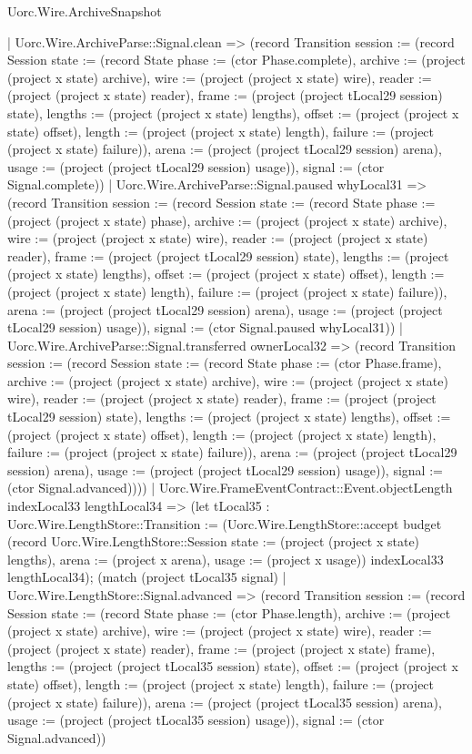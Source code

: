 \begin{lexlean}{Uorc.Wire.ArchiveSnapshot}
\begin{semanticmodule}
{        | Uorc.Wire.ArchiveParse::Signal.clean => (record Transition {session := (record Session {state := (record State {phase := (ctor Phase.complete), archive := (project (project x state) archive), wire := (project (project x state) wire), reader := (project (project x state) reader), frame := (project (project tLocal29 session) state), lengths := (project (project x state) lengths), offset := (project (project x state) offset), length := (project (project x state) length), failure := (project (project x state) failure)}), arena := (project (project tLocal29 session) arena), usage := (project (project tLocal29 session) usage)}), signal := (ctor Signal.complete)})
        | Uorc.Wire.ArchiveParse::Signal.paused whyLocal31 => (record Transition {session := (record Session {state := (record State {phase := (project (project x state) phase), archive := (project (project x state) archive), wire := (project (project x state) wire), reader := (project (project x state) reader), frame := (project (project tLocal29 session) state), lengths := (project (project x state) lengths), offset := (project (project x state) offset), length := (project (project x state) length), failure := (project (project x state) failure)}), arena := (project (project tLocal29 session) arena), usage := (project (project tLocal29 session) usage)}), signal := (ctor Signal.paused whyLocal31)})
        | Uorc.Wire.ArchiveParse::Signal.transferred ownerLocal32 => (record Transition {session := (record Session {state := (record State {phase := (ctor Phase.frame), archive := (project (project x state) archive), wire := (project (project x state) wire), reader := (project (project x state) reader), frame := (project (project tLocal29 session) state), lengths := (project (project x state) lengths), offset := (project (project x state) offset), length := (project (project x state) length), failure := (project (project x state) failure)}), arena := (project (project tLocal29 session) arena), usage := (project (project tLocal29 session) usage)}), signal := (ctor Signal.advanced)})))
      | Uorc.Wire.FrameEventContract::Event.objectLength indexLocal33 lengthLocal34 => (let tLocal35 : Uorc.Wire.LengthStore::Transition := (Uorc.Wire.LengthStore::accept budget (record Uorc.Wire.LengthStore::Session {state := (project (project x state) lengths), arena := (project x arena), usage := (project x usage)}) indexLocal33 lengthLocal34); (match (project tLocal35 signal)
        | Uorc.Wire.LengthStore::Signal.advanced => (record Transition {session := (record Session {state := (record State {phase := (ctor Phase.length), archive := (project (project x state) archive), wire := (project (project x state) wire), reader := (project (project x state) reader), frame := (project (project x state) frame), lengths := (project (project tLocal35 session) state), offset := (project (project x state) offset), length := (project (project x state) length), failure := (project (project x state) failure)}), arena := (project (project tLocal35 session) arena), usage := (project (project tLocal35 session) usage)}), signal := (ctor Signal.advanced)})
}
\end{semanticmodule}
\end{lexlean}
